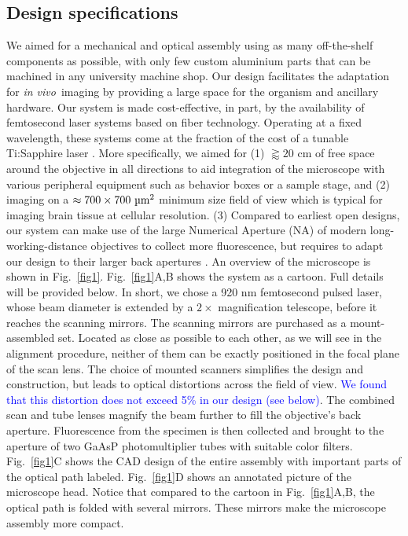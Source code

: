 \documentclass[10pt,letterpaper]{article}
\newcommand{\invivo}{\textit{in vivo}~}
\begin{document}
\subsection*{Design specifications}
We aimed for a mechanical and optical assembly using as many off-the-shelf components as possible, with only few custom aluminium parts that can be machined in any university machine shop. Our design  facilitates the adaptation for \invivo imaging by providing a large space for the organism and ancillary hardware. Our system is made cost-effective, in part, by the availability of femtosecond laser systems based on fiber technology. Operating at a fixed wavelength, these systems come at the fraction of the cost of a tunable Ti:Sapphire laser \cite{Bueno2019}.\newline
More specifically, we aimed for (1) $\gtrapprox20\text{ cm}$ of free space around the objective in all directions to aid integration of the microscope with various peripheral equipment such as behavior boxes or a sample stage, and (2) imaging on a  $\approx 700\times 700\text{ \textmu m}^2$ minimum size field of view which is typical for imaging brain tissue at cellular resolution. (3) Compared to earliest open designs\cite{Rosenegger2014, Mayrhofer2015}, our system can make use of the large Numerical Aperture (NA) of  modern long-working-distance objectives to collect more fluorescence, but requires to adapt our design to their larger back apertures \cite{Janelia2024}.\newline
An overview of the microscope is shown in Fig.~\ref{fig1}. Fig.~\ref{fig1}A,B shows the system as a cartoon. Full details will be provided below. In short, we chose a 920 nm femtosecond pulsed laser, whose beam diameter is extended by a $2\times$ magnification telescope, before it reaches the scanning mirrors. The scanning mirrors are purchased as a mount-assembled set. Located as close as possible to each other, as we will see in the alignment procedure, neither of them can be exactly positioned in the focal plane of the scan lens. The choice of mounted scanners simplifies the design and construction, but leads to optical distortions across the field of view. \textcolor{blue}{We found that this distortion does not exceed 5\% in our design (see below)}. The combined scan and tube lenses magnify the beam further to fill the objective's back aperture. Fluorescence from the specimen is then collected and brought to the aperture of two GaAsP photomultiplier tubes with suitable color filters. Fig.~\ref{fig1}C shows the CAD design of the entire assembly with important parts of the optical path labeled. Fig.~\ref{fig1}D shows an annotated picture of the microscope head. Notice that compared to the cartoon in Fig.~\ref{fig1}A,B, the optical path is folded with several mirrors. These mirrors make the microscope assembly more compact.
\end{document}
